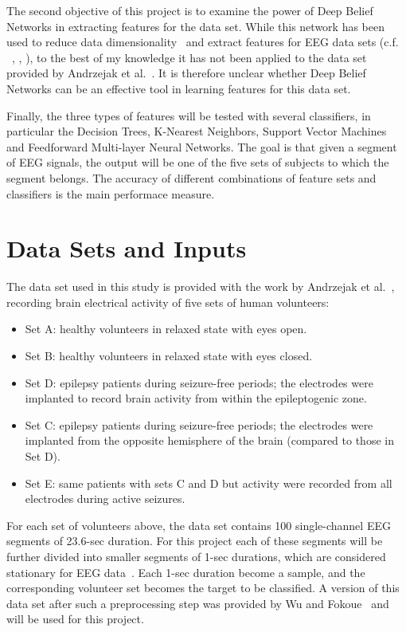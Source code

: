 \documentclass[12pt]{article}
\begin{document}
The second objective of this project is to examine the power of Deep Belief Networks in extracting features for the data set. While this network has been used to reduce data dimensionality~\cite{hinton2006reducing} and extract features for EEG data sets (c.f. ~\cite{langkvist2012sleep}, \cite{wang2013modeling}, \cite{wulsin2011modeling}), to the best of my knowledge it has not been applied to the data set provided by Andrzejak et al.~\cite{andrzejak2001indications}. It is therefore unclear whether Deep Belief Networks can be an effective tool in learning features for this data set.

Finally, the three types of features will be tested with several classifiers, in particular the Decision Trees, K-Nearest Neighbors, Support Vector Machines and Feedforward Multi-layer Neural Networks. The goal is that given a segment of EEG signals, the output will be one of the five sets of subjects to which the segment belongs. The accuracy of different combinations of feature sets and classifiers is the main performace measure.

\section{Data Sets and Inputs}

The data set used in this study is provided with the work by Andrzejak et al.~\cite{andrzejak2001indications}, recording brain electrical activity of five sets of human volunteers:
\begin{itemize}
\item Set A: healthy volunteers in relaxed state with eyes open.
\item Set B: healthy volunteers in relaxed state with eyes closed.
\item Set D: epilepsy patients during seizure-free periods; the electrodes were implanted to record brain activity from within the epileptogenic zone.
\item Set C: epilepsy patients during seizure-free periods; the electrodes were implanted from the opposite hemisphere of the brain (compared to those in Set D).
\item Set E: same patients with sets C and D but activity were recorded from all electrodes during active seizures.
\end{itemize}

For each set of volunteers above, the data set contains 100 single-channel EEG segments of 23.6-sec duration. For this project each of these segments will be further divided into smaller segments of 1-sec durations, which are considered stationary for EEG data~\cite{nigam2004neural}. Each 1-sec duration become a sample, and the corresponding volunteer set becomes the target to be classified. A version of this data set after such a preprocessing step was provided by Wu and Fokoue~\cite{UCISeizure} and will be used for this project. 
\end{document}
